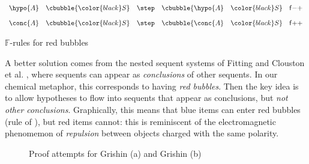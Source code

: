 \begin{marginfigure}
  $$
  \begin{array}{rclr}
    \hypo{A}~~~\cbubble{\color{black}S} &\step &\cbubble{\hypo{A}~~~\color{black}S} &\mathsf{f}{-}{+} \vspace{1em}\\
    \conc{A}~~~\cbubble{\color{black}S} &\step &\cbubble{\conc{A}~~~\color{black}S} &\mathsf{f}{+}{+} \\
  \end{array}
  $$
  \caption{$\mathbb{F}$-rules for red bubbles}
\end{marginfigure}

A better solution comes from the nested sequent systems of Fitting
 and Clouston et al.
, where sequents can appear as
\emph{conclusions} of other sequents. In our chemical metaphor, this corresponds
to having \emph{red bubbles}. Then the key idea is to allow hypotheses to flow
into sequents that appear as conclusions, but \emph{not other conclusions}.
Graphically, this means that blue items can enter red bubbles (rule
{} of ), but red items cannot: this is
reminiscent of the electromagnetic phenomemon of \emph{repulsion} between
objects charged with the same polarity.

\begin{figure*}
  
  \caption{Proof attempts for Grishin (a) and Grishin (b)}
\end{figure*}

